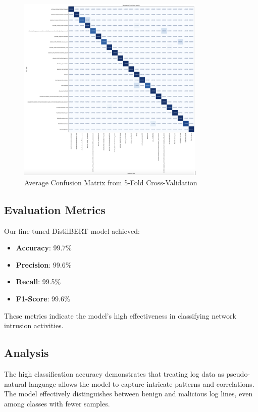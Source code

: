 \documentclass[12pt]{article}
\begin{document}
\begin{figure}[htbp]
    \centering
    \includegraphics[width=0.8\textwidth]{confusion_matrix.png}
    \caption{Average Confusion Matrix from 5-Fold Cross-Validation}
    \label{fig:confusion_matrix}
\end{figure}

\subsection{Evaluation Metrics}

Our fine-tuned DistilBERT model achieved:

\begin{itemize}
    \item \textbf{Accuracy}: 99.7\%
    \item \textbf{Precision}: 99.6\%
    \item \textbf{Recall}: 99.5\%
    \item \textbf{F1-Score}: 99.6\%
\end{itemize}

These metrics indicate the model's high effectiveness in classifying network intrusion activities.

\subsection{Analysis}

The high classification accuracy demonstrates that treating log data as pseudo-natural language allows the model to capture intricate patterns and correlations. The model effectively distinguishes between benign and malicious log lines, even among classes with fewer samples.
\end{document}
